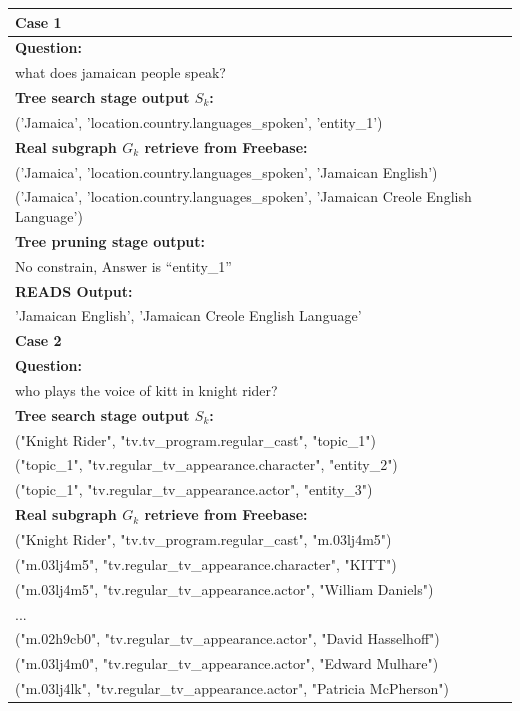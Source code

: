 \documentclass[11pt]{article}
\begin{document}
\begin{table}[]
\centering
\begin{tabular}{l}
\toprule[1pt]
\textbf{Case 1}   \\ \toprule[1pt]
\textbf{Question:} \\ what does jamaican people speak?\\
\textbf{Tree search stage output $S_k$:} \\
('Jamaica', 'location.country.languages\_spoken', 'entity\_1')\\
\textbf{Real subgraph $G_k$ retrieve from Freebase:}\\
('Jamaica', 'location.country.languages\_spoken', 'Jamaican English')\\
('Jamaica', 'location.country.languages\_spoken', 'Jamaican Creole English Language')\\
\textbf{Tree pruning stage output:}\\
No constrain, Answer is “entity\_1”\\
\textbf{READS Output:}\\
'Jamaican English', 'Jamaican Creole English Language' \\ \toprule[1pt]
\multicolumn{1}{l}{\textbf{Case 2}} \\ \toprule[1pt]
\textbf{Question:} \\ who plays the voice of kitt in knight rider?\\
\textbf{Tree search stage output $S_k$:} \\
("Knight Rider", "tv.tv\_program.regular\_cast", "topic\_1")\\
("topic\_1", "tv.regular\_tv\_appearance.character", "entity\_2")\\ 
("topic\_1", "tv.regular\_tv\_appearance.actor", "entity\_3")\\
\textbf{Real subgraph $G_k$ retrieve from Freebase:}\\
("Knight Rider", "tv.tv\_program.regular\_cast", "m.03lj4m5")\\
("m.03lj4m5", "tv.regular\_tv\_appearance.character", "KITT")\\
("m.03lj4m5", "tv.regular\_tv\_appearance.actor", "William Daniels")\\
...\\
("m.02h9cb0", "tv.regular\_tv\_appearance.actor", "David Hasselhoff")\\
("m.03lj4m0", "tv.regular\_tv\_appearance.actor", "Edward Mulhare")\\
("m.03lj4lk", "tv.regular\_tv\_appearance.actor", "Patricia McPherson")\\

\end{tabular}
\end{table}
\end{document}
